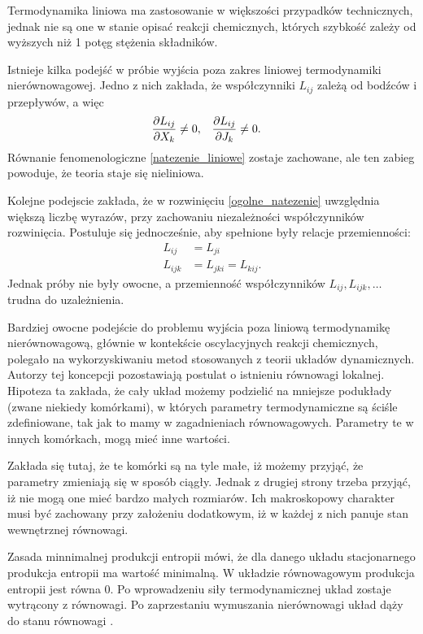 \documentclass[10pt, a4paper, twoside, onecolumn]{article}
\numberwithin{equation}{section}
\begin{document}
	Termodynamika liniowa ma zastosowanie w większości przypadków technicznych, jednak nie są one w stanie opisać reakcji chemicznych, których szybkość zależy od wyższych niż 1 potęg stężenia składników. \par
	Istnieje kilka podejść w próbie wyjścia poza zakres liniowej termodynamiki nierównowagowej. Jedno z nich zakłada, że współczynniki \(L_{ij}\) zależą od bodźców i przepływów, a więc
	\begin{align}
		& \pdv{L_{ij}}{X_{k}}\neq 0, && \pdv{L_{ij}}{J_{k}}\neq 0.
	\end{align}
	Równanie fenomenologiczne \eqref{natezenie_liniowe} zostaje zachowane, ale ten zabieg powoduje, że teoria staje się nieliniowa. \par
	Kolejne podejscie zakłada, że w rozwinięciu \eqref{ogolne_natezenie} uwzględnia większą liczbę wyrazów, przy zachowaniu niezależności współczynników rozwinięcia. Postuluje się jednocześnie, aby spełnione były relacje przemienności:
	\begin{align}
		L_{ij} &= L_{ji} \\
		L_{ijk} &= L_{jki} = L_{kij}.
	\end{align}
	Jednak próby nie były owocne, a przemienność współczynników \(L_{ij}, L_{ijk}, \ldots\) trudna do uzależnienia. \par
	Bardziej owocne podejście do problemu wyjścia poza liniową termodynamikę nierównowagową, głównie w kontekście oscylacyjnych reakcji chemicznych, polegało na wykorzyskiwaniu metod stosowanych z teorii układów dynamicznych. Autorzy tej koncepcji pozostawiają postulat o istnieniu równowagi lokalnej. Hipoteza ta zakłada, że cały układ możemy podzielić na mniejsze podukłady (zwane niekiedy komórkami), w których parametry termodynamiczne są ściśle zdefiniowane, tak jak to mamy w zagadnieniach równowagowych. Parametry te w innych komórkach, mogą mieć inne wartości. \par
	Zakłada się tutaj, że te komórki są na tyle małe, iż możemy przyjąć, że parametry zmieniają się w sposób ciągły. Jednak z drugiej strony trzeba przyjąć, iż nie mogą one mieć bardzo małych rozmiarów. Ich makroskopowy charakter musi być zachowany przy założeniu dodatkowym, iż w każdej z nich panuje stan wewnętrznej równowagi. \par
	Zasada minnimalnej produkcji entropii mówi, że dla danego układu stacjonarnego produkcja entropii ma wartość minimalną. W układzie równowagowym produkcja entropii jest równa 0. Po wprowadzeniu siły termodynamicznej układ zostaje wytrącony z równowagi. Po zaprzestaniu wymuszania nierównowagi układ dąży do stanu równowagi \cite{orlik}. \par
\end{document}
